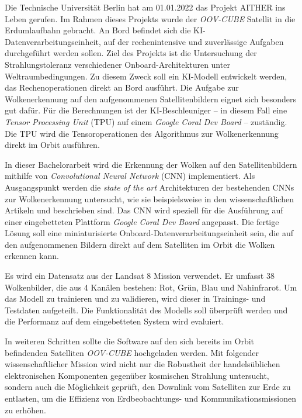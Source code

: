 {

\setlength{\parindent}{0pt}
\setlength{\parskip}{1em}


Die Technische Universität Berlin hat am 01.01.2022 das Projekt AITHER ins Leben gerufen. Im Rahmen dieses Projekts wurde der \textit{OOV-CUBE} Satellit in die Erdumlaufbahn gebracht. An Bord befindet sich die KI-Daten\-ver\-ar\-bei\-tungs\-ein\-heit, auf der rechenintensive und zuverlässige Aufgaben durchgeführt werden sollen. Ziel des Projekts ist die Untersuchung der Strahlungstoleranz verschiedener Onboard-Architekturen unter Welt\-raum\-be\-ding\-un\-gen. Zu diesem Zweck soll ein KI-Modell entwickelt werden, das Rechenoperationen direkt an Bord ausführt. Die Aufgabe zur Wolkenerkennung auf den aufgenommenen Satellitenbildern eignet sich besonders gut dafür. Für die Berechnungen ist der KI-Beschleuniger -- in diesem Fall eine \textit{Tensor Processing Unit} (TPU) auf einem \textit{Google Coral Dev Board} -- zuständig. Die TPU wird die Tensoroperationen des Algorithmus zur Wolkenerkennung direkt im Orbit ausführen.

In dieser Bachelorarbeit wird die Erkennung der Wolken auf den Satellitenbildern mithilfe von \textit{Convolutional Neural Network} (CNN) implementiert. Als Ausgangspunkt werden die \textit{state of the art} Architekturen der bestehenden CNNs zur Wolkenerkennung untersucht, wie sie beispielsweise in den wissenschaftlichen Artikeln \cite{CloudNet2019} und \cite{CloudDet2018} beschrieben sind. Das CNN wird speziell für die Ausführung auf einer eingebetteten Plattform \textit{Google Coral Dev Board} angepasst. Die fertige Lösung soll eine miniaturisierte Onboard-Da\-ten\-ver\-ar\-bei\-tungs\-ein\-heit sein, die auf den aufgenommenen Bildern direkt auf dem Satelliten im Orbit die Wolken erkennen kann.

Es wird ein Datensatz aus der Landsat 8 Mission verwendet. Er umfasst 38 Wolkenbilder, die aus 4 Kanälen bestehen: Rot, Grün, Blau und Nahinfrarot. Um das Modell zu trainieren und zu validieren, wird dieser in Trainings- und Testdaten aufgeteilt. Die Funktionalität des Modells soll überprüft werden und die Performanz auf dem eingebetteten System wird evaluiert. 

In weiteren Schritten sollte die Software auf den sich bereits im Orbit befindenden Satelliten \textit{OOV-CUBE} hochgeladen werden. Mit folgender wissenschaftlicher Mission wird nicht nur die Robustheit der handelsüblichen elektronischen Komponenten gegenüber kosmischen Strahlung untersucht, sondern auch die Möglichkeit geprüft, den Downlink vom Satelliten zur Erde zu entlasten, um die Effizienz von Erdbeobachtungs- und Kommunikationsmissionen zu erhöhen.


}
